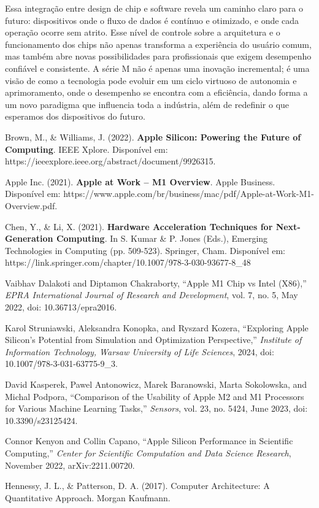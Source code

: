 \documentclass[a4paper,times,12pt]{article}
\begin{document}
Essa integração entre design de chip e software revela um caminho claro para o futuro: dispositivos onde o fluxo de dados é contínuo e otimizado, e onde cada operação ocorre sem atrito. Esse nível de controle sobre a arquitetura e o funcionamento dos chips não apenas transforma a experiência do usuário comum, mas também abre novas possibilidades para profissionais que exigem desempenho confiável e consistente. A série M não é apenas uma inovação incremental; é uma visão de como a tecnologia pode evoluir em um ciclo virtuoso de autonomia e aprimoramento, onde o desempenho se encontra com a eficiência, dando forma a um novo paradigma que influencia toda a indústria, além de redefinir o que esperamos dos dispositivos do futuro.


\newpage
\begin{thebibliography}{00}
 Brown, M., \& Williams, J. (2022). \textbf{Apple Silicon: Powering the Future of Computing}. IEEE Xplore. Disponível em: https://ieeexplore.ieee.org/abstract/document/9926315.

 Apple Inc. (2021). \textbf{Apple at Work – M1 Overview}. Apple Business. Disponível em: https://www.apple.com/br/business/mac/pdf/Apple-at-Work-M1-Overview.pdf.

 Chen, Y., \& Li, X. (2021). \textbf{Hardware Acceleration Techniques for Next-Generation Computing}. In S. Kumar \& P. Jones (Eds.), Emerging Technologies in Computing (pp. 509-523). Springer, Cham. Disponível em: https://link.springer.com/chapter/10.1007/978-3-030-93677-8\_48

Vaibhav Dalakoti and Diptamon Chakraborty, ``Apple M1 Chip vs Intel (X86),'' \textit{EPRA International Journal of Research and Development}, vol. 7, no. 5, May 2022, doi: 10.36713/epra2016.

Karol Struniawski, Aleksandra Konopka, and Ryszard Kozera, ``Exploring Apple Silicon's Potential from Simulation and Optimization Perspective,'' \textit{Institute of Information Technology, Warsaw University of Life Sciences}, 2024, doi: 10.1007/978-3-031-63775-9\_3.

David Kasperek, Pawel Antonowicz, Marek Baranowski, Marta Sokolowska, and Michal Podpora, ``Comparison of the Usability of Apple M2 and M1 Processors for Various Machine Learning Tasks,'' \textit{Sensors}, vol. 23, no. 5424, June 2023, doi: 10.3390/s23125424.

Connor Kenyon and Collin Capano, ``Apple Silicon Performance in Scientific Computing,'' \textit{Center for Scientific Computation and Data Science Research}, November 2022, arXiv:2211.00720.

Hennessy, J. L., \& Patterson, D. A. (2017). Computer Architecture: A Quantitative Approach. Morgan Kaufmann.
\end{thebibliography}
\end{document}

